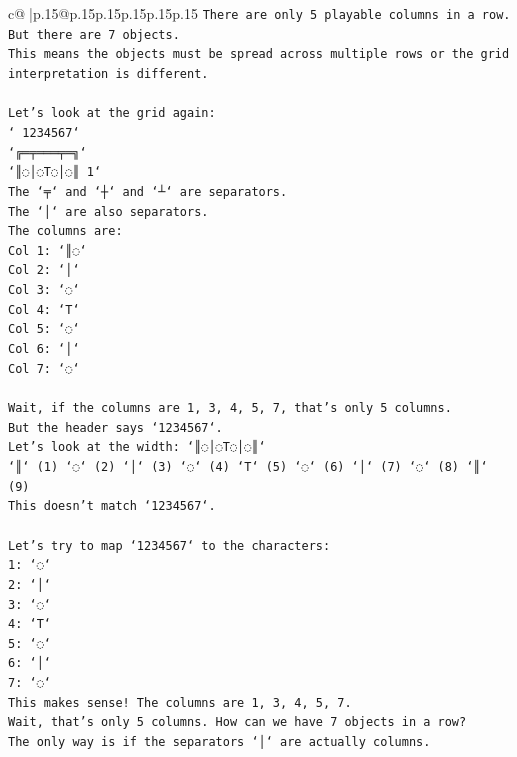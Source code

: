 \documentclass{article}
\begin{document}
{\begin{supertabular}{c@{$\;$}|p{.15\linewidth}@{}p{.15\linewidth}p{.15\linewidth}p{.15\linewidth}p{.15\linewidth}p{.15\linewidth}}
{{{\texttt{There are only 5 playable columns in a row. But there are 7 objects.} \\
\texttt{This means the objects must be spread across multiple rows or the grid interpretation is different.} \\
\\ 
\texttt{Let's look at the grid again:} \\
\texttt{` 1234567`} \\
\texttt{`╔═╤═══╤═╗`} \\
\texttt{`║◌│◌T◌│◌║ 1`} \\
\texttt{The `╤` and `┼` and `┴` are separators.} \\
\texttt{The `│` are also separators.} \\
\texttt{The columns are:} \\
\texttt{Col 1: `║◌`} \\
\texttt{Col 2: `│`} \\
\texttt{Col 3: `◌`} \\
\texttt{Col 4: `T`} \\
\texttt{Col 5: `◌`} \\
\texttt{Col 6: `│`} \\
\texttt{Col 7: `◌`} \\
\\ 
\texttt{Wait, if the columns are 1, 3, 4, 5, 7, that's only 5 columns.} \\
\texttt{But the header says `1234567`.} \\
\texttt{Let's look at the width: `║◌│◌T◌│◌║`} \\
\texttt{`║` (1) `◌` (2) `│` (3) `◌` (4) `T` (5) `◌` (6) `│` (7) `◌` (8) `║` (9)} \\
\texttt{This doesn't match `1234567`.} \\
\\ 
\texttt{Let's try to map `1234567` to the characters:} \\
\texttt{1: `◌`} \\
\texttt{2: `│`} \\
\texttt{3: `◌`} \\
\texttt{4: `T`} \\
\texttt{5: `◌`} \\
\texttt{6: `│`} \\
\texttt{7: `◌`} \\
\texttt{This makes sense! The columns are 1, 3, 4, 5, 7.} \\
\texttt{Wait, that's only 5 columns. How can we have 7 objects in a row?} \\
\texttt{The only way is if the separators `│` are actually columns.} \\
}}}
\end{supertabular}}
\end{document}
